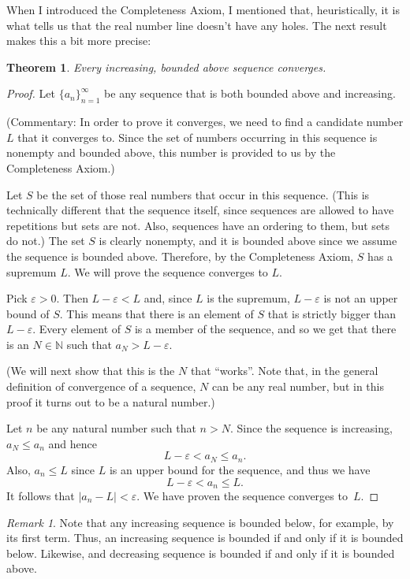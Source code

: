 \documentclass[12pt]{amsart}
\def\e{\varepsilon}
\newcommand{\N}{\mathbb{N}}
\numberwithin{equation}{section}
\theoremstyle{plain} %
\newtheorem{thm}[equation]{Theorem}
\theoremstyle{definition}
\theoremstyle{remark}
\newtheorem{rem}[equation]{Remark}
\begin{document}
 
When I introduced the Completeness Axiom, I mentioned that, heuristically, it is what tells us that the real number line doesn't have any
holes. The next result makes this a bit more precise:

\begin{thm}\label{thm216}
Every increasing, bounded above sequence converges.
\end{thm}



\begin{proof} Let $\{a_n\}_{n=1}^\infty$ be any sequence that is both  bounded above and increasing.

(Commentary: In order to prove it converges, we need to find a candidate number $L$ that
  it converges to. Since the set of numbers occurring in this sequence is nonempty and bounded above, this number is provided to us by the Completeness Axiom.) 

Let $S$ be the set of those real numbers that occur in this sequence. (This is technically different that the sequence itself, since sequences are allowed to
have repetitions but sets are not. Also, sequences have an ordering to
them, but sets do not.) 
The set $S$ is clearly
  nonempty, and it is bounded above since we assume the sequence is bounded above. Therefore, by the Completeness Axiom, $S$ has a supremum $L$. We will prove the
  sequence converges to $L$.

Pick $\e > 0$. Then $L - \e < L$ and, since $L$ is the supremum, $L - \e$ is not an upper bound of $S$. This means that 
there is an element of $S$ that is strictly bigger than $L-
\e$. Every element of $S$ is a member of the sequence, and so we get that there is an $N \in \N$ such that $a_N > L - \e$. 

(We will next show that this is the $N$ that ``works''. Note that, in the general definition of convergence of a sequence, $N$ can be any real number, but in this proof it turns
out to be a natural number.)

Let $n$ be any natural number such that $n > N$. Since the sequence is increasing, $a_N \leq a_n$ and hence
$$
L - \e < a_N \leq a_n.
$$
Also, $a_n \leq L$ since $L$ is an upper bound for the sequence, and thus we have
$$
L- \e < a_n \leq L.
$$
It follows that  $|a_n - L| < \e$. We have proven the sequence converges to~$L$.
\end{proof}

\begin{rem} Note that any increasing sequence is bounded below, for example, by its first term. Thus, an increasing sequence is bounded if and only if it is bounded below. Likewise, and decreasing sequence is bounded if and only if it is bounded above.
\end{rem}
\end{document}
